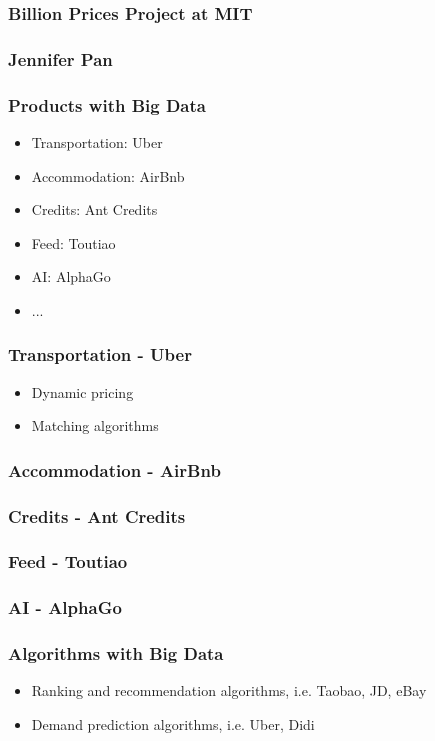 \documentclass{beamer}
\begin{document}
\begin{frame}
\frametitle{Billion Prices Project at MIT}
\end{frame}

\begin{frame}
\frametitle{Jennifer Pan}
\end{frame}

\begin{frame}
\frametitle{Products with Big Data}
\begin{itemize}
\item Transportation: Uber
\item Accommodation: AirBnb
\item Credits: Ant Credits
\item Feed: Toutiao
\item AI: AlphaGo
\item ...
\end{itemize}
\end{frame}

\begin{frame}
\frametitle{Transportation - Uber}
\begin{itemize}
\item Dynamic pricing
\item Matching algorithms
\end{itemize}
\end{frame}

\begin{frame}
\frametitle{Accommodation - AirBnb}
\end{frame}

\begin{frame}
\frametitle{Credits - Ant Credits}
\end{frame}

\begin{frame}
\frametitle{Feed - Toutiao}
\end{frame}

\begin{frame}
\frametitle{AI - AlphaGo}
\end{frame}

\begin{frame}
\frametitle{Algorithms with Big Data} 
\begin{itemize}
\item Ranking and recommendation algorithms, i.e. Taobao, JD, eBay
\item Demand prediction algorithms, i.e. Uber, Didi
\end{itemize}
\end{frame}
\end{document}
